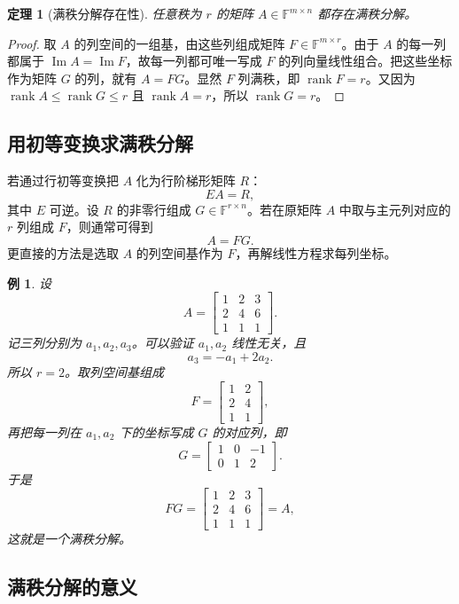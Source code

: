 \documentclass[UTF8,openany,zihao=-4]{ctexbook}
\theoremstyle{cnplain}
\newtheorem{theorem}{定理}[chapter]
\newtheorem{example}{例}[chapter]
\newcommand{\F}{\mathbb F}
\newcommand{\rank}{\operatorname{rank}}
\newcommand{\Img}{\operatorname{Im}}
\begin{document}
\begin{theorem}[满秩分解存在性]
任意秩为 $r$ 的矩阵 $A\in\F^{m\times n}$ 都存在满秩分解。
\end{theorem}

\begin{proof}
取 $A$ 的列空间的一组基，由这些列组成矩阵 $F\in\F^{m\times r}$。由于 $A$ 的每一列都属于 $\Img A=\Img F$，故每一列都可唯一写成 $F$ 的列向量线性组合。把这些坐标作为矩阵 $G$ 的列，就有 $A=FG$。显然 $F$ 列满秩，即 $\rank F=r$。又因为 $\rank A\le \rank G\le r$ 且 $\rank A=r$，所以 $\rank G=r$。
\end{proof}

\subsection{用初等变换求满秩分解}

若通过行初等变换把 $A$ 化为行阶梯形矩阵 $R$：
\[
EA=R,
\]
其中 $E$ 可逆。设 $R$ 的非零行组成 $G\in\F^{r\times n}$。若在原矩阵 $A$ 中取与主元列对应的 $r$ 列组成 $F$，则通常可得到
\[
A=FG.
\]
更直接的方法是选取 $A$ 的列空间基作为 $F$，再解线性方程求每列坐标。

\begin{example}
设
\[
A=\begin{bmatrix}
1&2&3\\
2&4&6\\
1&1&1
\end{bmatrix}.
\]
记三列分别为 $a_1,a_2,a_3$。可以验证 $a_1,a_2$ 线性无关，且
\[
a_3=-a_1+2a_2.
\]
所以 $r=2$。取列空间基组成
\[
F=\begin{bmatrix}
1&2\\
2&4\\
1&1
\end{bmatrix},
\]
再把每一列在 $a_1,a_2$ 下的坐标写成 $G$ 的对应列，即
\[
G=\begin{bmatrix}
1&0&-1\\
0&1&2
\end{bmatrix}.
\]
于是
\[
FG=\begin{bmatrix}
1&2&3\\
2&4&6\\
1&1&1
\end{bmatrix}=A,
\]
这就是一个满秩分解。
\end{example}

\subsection{满秩分解的意义}
\end{document}
